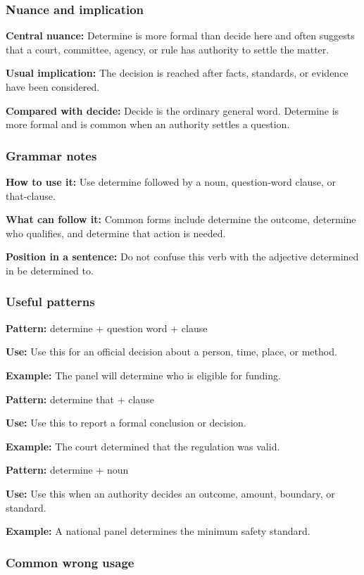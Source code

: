 \documentclass[11pt]{article}
\begin{document}
\subsubsection{Nuance and implication}
\textbf{Central nuance:} Determine is more formal than decide here and often suggests that a court, committee, agency, or rule has authority to settle the matter.

\textbf{Usual implication:} The decision is reached after facts, standards, or evidence have been considered.

\textbf{Compared with decide:} Decide is the ordinary general word. Determine is more formal and is common when an authority settles a question.

\subsubsection{Grammar notes}
\textbf{How to use it:} Use determine followed by a noun, question-word clause, or that-clause.

\textbf{What can follow it:} Common forms include determine the outcome, determine who qualifies, and determine that action is needed.

\textbf{Position in a sentence:} Do not confuse this verb with the adjective determined in be determined to.

\subsubsection{Useful patterns}
\textbf{Pattern:} determine + question word + clause

\textbf{Use:} Use this for an official decision about a person, time, place, or method.

\textbf{Example:} The panel will determine who is eligible for funding.

\textbf{Pattern:} determine that + clause

\textbf{Use:} Use this to report a formal conclusion or decision.

\textbf{Example:} The court determined that the regulation was valid.

\textbf{Pattern:} determine + noun

\textbf{Use:} Use this when an authority decides an outcome, amount, boundary, or standard.

\textbf{Example:} A national panel determines the minimum safety standard.

\subsubsection{Common wrong usage}
\end{document}
